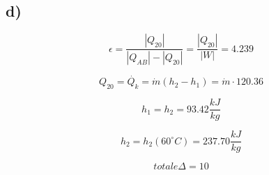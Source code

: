 

\subsection*{d)}

\begin{equation*}
    \epsilon = \frac{|Q_{20}|}{|Q_{AB}| - |Q_{20}|} = \frac{|Q_{20}|}{|W|} = 4.239
\end{equation*}

\begin{equation*}
    Q_{20} = \dot{Q_k} = \dot{m}(h_2 - h_1) = \dot{m} \cdot 120.36
\end{equation*}

\begin{equation*}
    h_1 = h_2 = 93.42 \frac{kJ}{kg}
\end{equation*}

\begin{equation*}
    h_2 = h_2(60^\circ C) = 237.70 \frac{kJ}{kg}
\end{equation*}

\begin{equation*}
    totale \Delta = 10
\end{equation*}